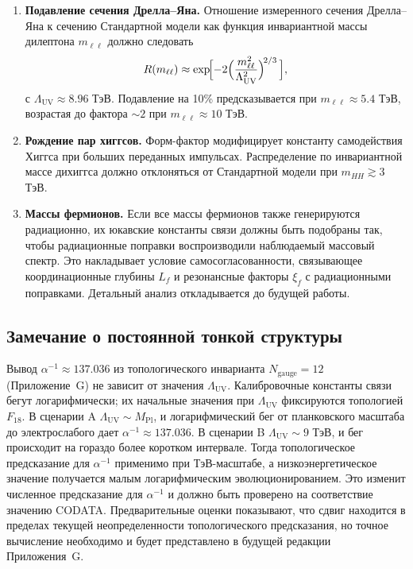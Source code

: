 \documentclass[11pt,a4paper]{article}
\newcommand{\Mpl}{M_{\mathrm{Pl}}}
\newcommand{\LUV}{\Lambda_{\mathrm{UV}}}
\theoremstyle{remark}
\begin{document}
	\begin{enumerate}[label=(\arabic*)]
		\item \textbf{Подавление сечения Дрелла–Яна.} Отношение измеренного сечения Дрелла–Яна к сечению Стандартной модели как функция инвариантной массы дилептона \(m_{\ell\ell}\) должно следовать
		\[
		R(m_{\ell\ell}) \approx \exp\!\Bigl[-2\Bigl(\frac{m_{\ell\ell}^2}{\LUV^2}\Bigr)^{\!2/3}\,\Bigr],
		\]
		с \(\LUV \approx 8.96\) ТэВ. Подавление на 10\% предсказывается при \(m_{\ell\ell} \approx 5.4\) ТэВ, возрастая до фактора \(\sim 2\) при \(m_{\ell\ell} \approx 10\) ТэВ.
		
		\item \textbf{Рождение пар хиггсов.} Форм-фактор модифицирует константу самодействия Хиггса при больших переданных импульсах. Распределение по инвариантной массе дихиггса должно отклоняться от Стандартной модели при \(m_{HH} \gtrsim 3\) ТэВ.
		
		\item \textbf{Массы фермионов.} Если все массы фермионов также генерируются радиационно, их юкавские константы связи должны быть подобраны так, чтобы радиационные поправки воспроизводили наблюдаемый массовый спектр. Это накладывает условие самосогласованности, связывающее координационные глубины \(L_f\) и резонансные факторы \(\xi_f\) с радиационными поправками. Детальный анализ откладывается до будущей работы.
	\end{enumerate}
	
	\subsection{Замечание о постоянной тонкой структуры}
	
	Вывод \(\alpha^{-1} \approx 137.036\) из топологического инварианта \(N_{\mathrm{gauge}} = 12\) (Приложение~G) не зависит от значения \(\LUV\). Калибровочные константы связи бегут логарифмически; их начальные значения при \(\LUV\) фиксируются топологией \(F_{18}\). В сценарии A \(\LUV \sim \Mpl\), и логарифмический бег от планковского масштаба до электрослабого дает \(\alpha^{-1} \approx 137.036\). В сценарии B \(\LUV \sim 9\) ТэВ, и бег происходит на гораздо более коротком интервале. Тогда топологическое предсказание для \(\alpha^{-1}\) применимо при ТэВ-масштабе, а низкоэнергетическое значение получается малым логарифмическим эволюционированием. Это изменит численное предсказание для \(\alpha^{-1}\) и должно быть проверено на соответствие значению CODATA. Предварительные оценки показывают, что сдвиг находится в пределах текущей неопределенности топологического предсказания, но точное вычисление необходимо и будет представлено в будущей редакции Приложения~G.
	
\end{document}

